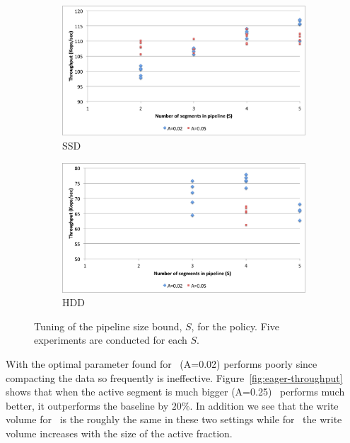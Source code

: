 \begin{figure}[tb]

  \centering
  
  \begin{subfigure}[t]{\columnwidth}
      \includegraphics[width=\figw]{Figs/pipeline-1-ssd.png}
      \caption[]{SSD}
    \label{fig:pipeline:ssd}  
  \end{subfigure}   
  \begin{subfigure}[t]{\columnwidth}
      \includegraphics[width=\figw]{Figs/pipeline-1-hdd.png}
      \caption[]{HDD}
    \label{fig:pipeline:hdd}
  \end{subfigure}

\caption{Tuning of the pipeline size bound, $S$, for the \basic\/ policy. Five experiments are conducted for each $S$.} 
\label{fig:pipeline}
\end{figure}

With the optimal parameter found for \basic\ (A=0.02) \eager\/ performs poorly since compacting the data so frequently is ineffective. Figure~\ref{fig:eager-throughput} shows that when the active segment is much bigger (A=0.25) \eager\ performs much better, it outperforms the baseline by $20\%$.
In addition we see that the write volume for \eager\ is the roughly the same in these two settings while for \basic\ the write volume increases with the size of the active fraction.  

